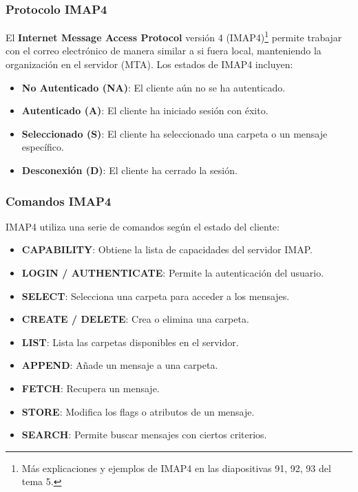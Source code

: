 \documentclass[a4paper,12pt]{article}
\begin{document}
\subsubsection{Protocolo IMAP4}

El \textbf{Internet Message Access Protocol} versión 4 (IMAP4)\footnote{Más explicaciones y ejemplos de IMAP4 en las diapositivas 91, 92, 93 del tema 5.} permite trabajar con el correo electrónico de manera similar a si fuera local, manteniendo la organización en el servidor (MTA). Los estados de IMAP4 incluyen:

\begin{itemize}
    \item \textbf{No Autenticado (NA)}: El cliente aún no se ha autenticado.
    \item \textbf{Autenticado (A)}: El cliente ha iniciado sesión con éxito.
    \item \textbf{Seleccionado (S)}: El cliente ha seleccionado una carpeta o un mensaje específico.
    \item \textbf{Desconexión (D)}: El cliente ha cerrado la sesión.
\end{itemize}

\subsubsection{Comandos IMAP4}

IMAP4 utiliza una serie de comandos según el estado del cliente:

\begin{itemize}
    \item \textbf{CAPABILITY}: Obtiene la lista de capacidades del servidor IMAP.
    \item \textbf{LOGIN / AUTHENTICATE}: Permite la autenticación del usuario.
    \item \textbf{SELECT}: Selecciona una carpeta para acceder a los mensajes.
    \item \textbf{CREATE / DELETE}: Crea o elimina una carpeta.
    \item \textbf{LIST}: Lista las carpetas disponibles en el servidor.
    \item \textbf{APPEND}: Añade un mensaje a una carpeta.
    \item \textbf{FETCH}: Recupera un mensaje.
    \item \textbf{STORE}: Modifica los flags o atributos de un mensaje.
    \item \textbf{SEARCH}: Permite buscar mensajes con ciertos criterios.
\end{itemize}
\end{document}
